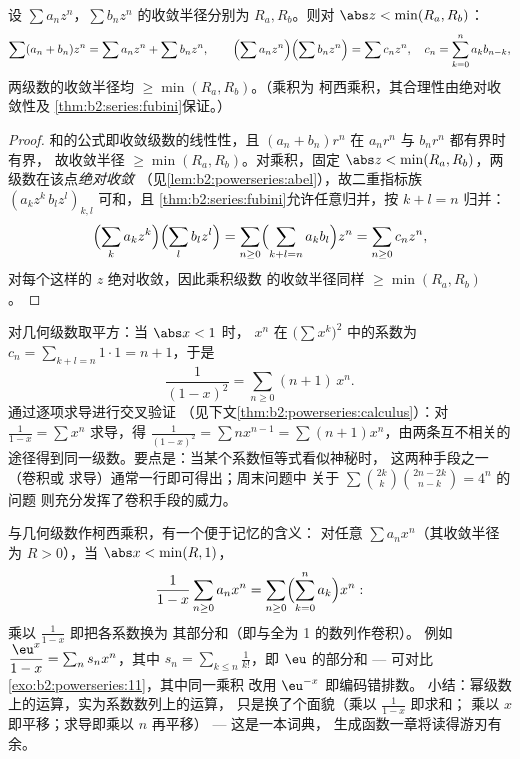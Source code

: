 \begin{proposition}[运算]\label{prop:b2:powerseries:operations}
设 $\sum a_nz^n$，$\sum b_nz^n$ 的收敛半径分别为 $R_a, R_b$。则对
$\abs z < \min(R_a, R_b)$：
\[
\sum (a_n + b_n)z^n = \sum a_nz^n + \sum b_nz^n,
\qquad
\Bigl(\sum a_nz^n\Bigr)\Bigl(\sum b_nz^n\Bigr) = \sum c_n z^n,
\quad c_n = \sum_{k=0}^{n} a_kb_{n-k},
\]
两级数的收敛半径均 $\geq \min(R_a, R_b)$。（乘积为
柯西乘积，其合理性由绝对收敛性及
\cref{thm:b2:series:fubini}保证。）
\end{proposition}

\begin{proof}
和的公式即收敛级数的线性性，且
$(a_n + b_n)r^n$ 在 $a_nr^n$ 与 $b_nr^n$ 都有界时有界，
故收敛半径 $\geq \min(R_a, R_b)$。对乘积，固定 $\abs z
< \min(R_a, R_b)$，两级数在该点\emph{绝对收敛}
（见\cref{lem:b2:powerseries:abel}），故二重指标族
$(a_kz^k\,b_lz^l)_{k,l}$ 可和，且
\cref{thm:b2:series:fubini}允许任意归并，按 $k
+ l = n$ 归并：
\[
\Bigl(\sum_k a_kz^k\Bigr)\Bigl(\sum_l b_lz^l\Bigr)
= \sum_{n\geq0}\Bigl(\sum_{k+l=n}a_kb_l\Bigr)z^n
= \sum_{n\geq0}c_nz^n ,
\]
对每个这样的 $z$ 绝对收敛，因此乘积级数
的收敛半径同样 $\geq \min(R_a, R_b)$。
\end{proof}

\begin{example}[柯西平方的交叉验证]\label{ex:b2:powerseries:cauchysquare}
对几何级数取平方：当 $\abs x < 1$ 时，
$x^n$ 在 $\bigl(\sum x^k\bigr)^2$ 中的系数为 $c_n = \sum_{k+l=n}
1\cdot1 = n + 1$，于是
\[
\frac{1}{(1-x)^2} = \sum_{n\geq0}(n+1)\,x^n .
\]
通过逐项求导进行交叉验证
（见下文\cref{thm:b2:powerseries:calculus}）：对
$\frac{1}{1-x} = \sum x^n$ 求导，得 $\frac{1}{(1-x)^2} = \sum
nx^{n-1} = \sum(n+1)x^n$，由两条互不相关的
途径得到同一级数。要点是：当某个系数恒等式看似神秘时，
这两种手段之一（卷积或
求导）通常一行即可得出；周末问题中
关于 $\sum\binom{2k}k\binom{2n-2k}{n-k} = 4^n$ 的问题
则充分发挥了卷积手段的威力。
\end{example}

\begin{example}\label{ex:b2:powerseries:partialsums}
与几何级数作柯西乘积，有一个便于记忆的含义：
对任意 $\sum a_nx^n$（其收敛半径为 $R > 0$），当 $\abs x <
\min(R, 1)$，
\[
\frac{1}{1-x}\sum_{n\geq0}a_nx^n
= \sum_{n\geq0}\Bigl(\sum_{k=0}^{n}a_k\Bigr)x^n :
\]
乘以 $\frac{1}{1-x}$ 即把各系数换为
其部分和（即与全为 1 的数列作卷积）。
例如 $\dfrac{\eu^x}{1-x} = \sum_n s_n x^n$，其中 $s_n =
\sum_{k\leq n}\frac{1}{k!}$，即 $\eu$ 的部分和 ---
可对比 \cref{exo:b2:powerseries:11}，其中同一乘积
改用 $\eu^{-x}$ 即编码错排数。
小结：幂级数上的运算，实为系数数列上的运算，
只是换了个面貌（乘以 $\frac1{1-x}$ 即求和；
乘以 $x$ 即平移；求导即乘以 $n$ 再平移）
--- 这是一本词典，
生成函数一章将读得游刃有余。
\end{example}

